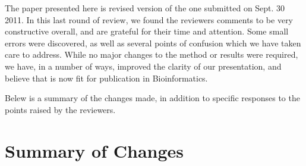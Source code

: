 \documentclass{article}
\begin{document}
The paper presented here is revised version of the one submitted on Sept. 30
2011. In this last round of review, we found the reviewers comments to be
very constructive overall, and are grateful for their time and attention. Some
small errors were discovered, as well as several points of confusion which we
have taken care to address. While no major changes to the method or results were
required, we have, in a number of ways, improved the clarity of our
presentation, and believe that is now fit for publication in Bioinformatics.

Belew is a summary of the changes made, in addition to specific responses to the
points raised by the reviewers.

\section*{Summary of Changes}
\end{document}
